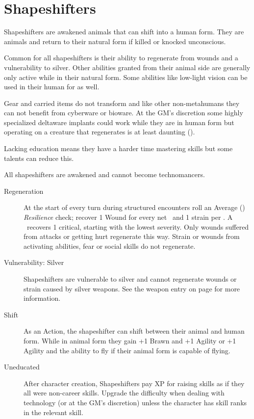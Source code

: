 \documentclass{book}
\begin{document}
\section{Shapeshifters}
\label{sec:shapeshifters}
\begin{multicols}{2}
Shapeshifters are awakened animals that can shift into a human form. They are animals and return to their natural form if killed or knocked unconscious. 

Common for all shapeshifters is their ability to regenerate from wounds and a vulnerability to silver. Other abilities granted from their animal side are generally only active while in their natural form. Some abilities like low-light vision can be used in their human for as well.

Gear and carried items do not transform and like other non-metahumans they can not benefit from cyberware or bioware. At the GM's discretion some highly specialized deltaware implants could work while they are in human form but operating on a creature that regenerates is at least daunting (\DifficultyDie \DifficultyDie \DifficultyDie \DifficultyDie).

Lacking education means they have a harder time mastering skills but some talents can reduce this.

All shapeshifters are awakened and cannot become technomancers.


\begin{description}
	\item[Regeneration] At the start of every turn during structured encounters roll an Average (\DifficultyDie \DifficultyDie) \emph{Resilience} check; recover 1 Wound for every net \Success\ and 1 strain per \Advantage. A \Triumph\ recovers 1 critical, starting with the lowest severity. Only wounds suffered from attacks or getting hurt regenerate this way. Strain or wounds from activating abilities, fear or social skills do not regenerate.
	\item[Vulnerability: Silver] Shapeshifters are vulnerable to silver and cannot regenerate wounds or strain caused by silver weapons. See the weapon entry on page \pageref{silver} for more information.
	\item[Shift] As an Action, the shapeshifter can shift between their animal and human form. While in animal form they gain +1 Brawn and +1 Agility or +1 Agility and the ability to fly if their animal form is capable of flying.
	\item[Uneducated] \label{uneducated} After character creation, Shapeshifters pay XP for raising skills as if they all were non-career skills. Upgrade the difficulty when dealing with technology (or at the GM's discretion) unless the character has skill ranks in the relevant skill.  
\end{description}

\end{multicols}
\end{document}
